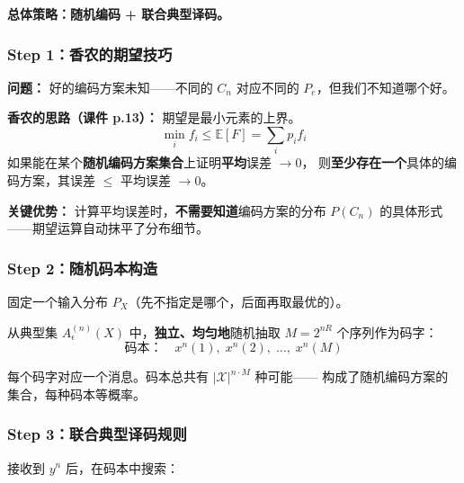 \documentclass[12pt,a4paper]{ctexart}
\theoremstyle{definition}
\newcommand{\XX}{\mathcal{X}}
\begin{document}
\textbf{总体策略：随机编码 + 联合典型译码。}

\subsubsection{Step 1：香农的期望技巧}

\textbf{问题：} 好的编码方案未知——不同的 $C_n$ 对应不同的 $P_e$，但我们不知道哪个好。

\textbf{香农的思路（课件 p.13）：} 期望是最小元素的上界。
\[
\min_i f_i \leq \mathbb{E}[F] = \sum_i p_i f_i
\]
如果能在某个\textbf{随机编码方案集合}上证明\textbf{平均}误差 $\to 0$，
则\textbf{至少存在一个}具体的编码方案，其误差 $\leq$ 平均误差 $\to 0$。

\textbf{关键优势：} 计算平均误差时，\textbf{不需要知道}编码方案的分布 $P(C_n)$ 的具体形式——期望运算自动抹平了分布细节。

\subsubsection{Step 2：随机码本构造}

固定一个输入分布 $P_X$（先不指定是哪个，后面再取最优的）。

从典型集 $A_\epsilon^{(n)}(X)$ 中，\textbf{独立、均匀地}随机抽取 $M = 2^{nR}$ 个序列作为码字：
\[
\text{码本：}\quad x^n(1),\; x^n(2),\; \ldots,\; x^n(M)
\]

每个码字对应一个消息。码本总共有 $|\XX|^{n \cdot M}$ 种可能——
构成了随机编码方案的集合，每种码本等概率。

\subsubsection{Step 3：联合典型译码规则}

接收到 $y^n$ 后，在码本中搜索：

\begin{center}
\end{center}
\end{document}
